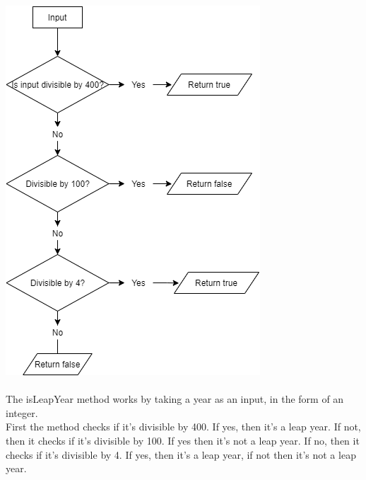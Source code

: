 \documentclass{article}
\begin{document}
\includegraphics[scale=0.8]{Images/Diagram.png}
\\
\\
The isLeapYear method works by taking a year as an input, in the form of an integer. 
\\
First the method checks if it's divisible by 400. 
If yes, then it's a leap year. If not, then it checks if it's divisible by 100. 
If yes then it's not a leap year. If no, then it checks if it's  divisible by 4. 
If yes, then it's a leap year, if not then it's not a leap year.
\end{document}
